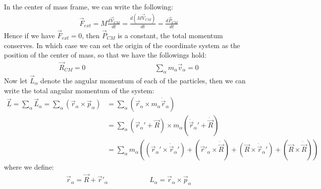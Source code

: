 \documentclass[11pt,oneside]{book}
\theoremstyle{break}
\theoremstyle{break}
\begin{document}
In the center of mass frame, we can write the following:
\begin{align*}
\vec{F}_{ext} = M \frac{d\vec{V}_{CM}}{dt} = \frac{d(M\vec{V}_{CM})}{dt} = \frac{d\vec{P}_{CM}}{dt}
\end{align*}
Hence if we have $\vec{F}_{ext} = 0$, then $\vec{P}_{CM}$ is a constant, the total momentum conserves. In which case we can set the origin of the coordinate system as the position of the center of mass, so that we have the followings hold:
\begin{align*}
\vec{R}_{CM} = 0\qquad\qquad\qquad\qquad\qquad \sum_{\alpha}m_{\alpha}\vec{v}_{\alpha} = 0
\end{align*}
Now let $\vec{L}_{\alpha}$ denote the angular momentum of each of the particles, then we can write the total angular momentum of the system:
\begin{align*}
\vec{L} = \sum_{\alpha}\vec{L}_{\alpha} = \sum_{\alpha}(\vec{r}_{\alpha}\times \vec{p}_{\alpha}) &= \sum_{\alpha}(\vec{r}_{\alpha}\times m_{\alpha}\dot{\vec{r}}_{\alpha})\\
&= \sum_{\alpha}(\vec{r}_{\alpha}' + \vec{R}) \times m_{\alpha}(\dot{\vec{r}}_{\alpha}' + \dot{\vec{R}}) \\
&= \sum_{\alpha}m_{\alpha}\left( (\vec{r}_\alpha' \times \dot{\vec{r}}_{\alpha}') + (\vec{r}'_{\alpha}\times \dot{\vec{R}}) + (\vec{R}\times \dot{\vec{r}}_{\alpha}') + (\vec{R}\times \dot{\vec{R}})\right) \tag{*}
\end{align*}
where we define:
\begin{align*}
\vec{r}_{\alpha} = \vec{R}+\vec{r}'_{\alpha} \qquad\qquad\qquad L_{\alpha} = \vec{r}_{\alpha}\times \vec{p}_{\alpha}
\end{align*}
\end{document}
